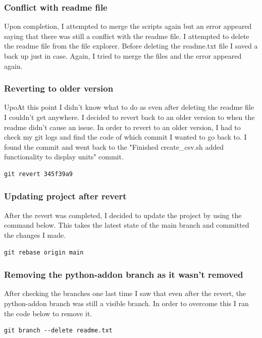 \documentclass[]{article}
\begin{document}
\subsubsection{Conflict with readme file}
Upon completion, I attempted to merge the scripts again but an error appeared saying that there was still a conflict with the readme file.
I attempted to delete the readme file from the file explorer. Before deleting the readme.txt file I saved a back up just in case. Again, I tried
to merge the files and the error appeared again.


\subsubsection{Reverting to older version}
UpoAt this point I didn't know what to do as even after deleting the readme file I couldn't get anywhere.
I decided to revert back to an older version to when the readme didn't cause an issue. In order to revert to
an older version, I had to check my git logs and find the code of which commit I wanted to go back to. I found
the commit and went back to the "Finished create\_csv.sh added functionality to display units" commit.
\begin{tcolorbox}[colback=white, colframe=black, boxrule=1pt, 
    fonttitle=\bfseries, listing only, listing options={language=sh, basicstyle=\ttfamily}]
\begin{verbatim}
git revert 345f39a9
\end{verbatim}
\end{tcolorbox}

\subsubsection{Updating project after revert}
After the revert was completed, I decided to update the project by using the command below. This takes the latest state
of the main branch and committed the changes I made.
\begin{tcolorbox}[colback=white, colframe=black, boxrule=1pt, 
    fonttitle=\bfseries, listing only, listing options={language=sh, basicstyle=\ttfamily}]
\begin{verbatim}
git rebase origin main
\end{verbatim}
\end{tcolorbox}

\subsubsection{Removing the python-addon branch as it wasn't removed}
After checking the branches one last time I saw that even after the revert, the
python-addon branch was still a visible branch. In order to overcome this I ran the code below to remove it.
\begin{tcolorbox}[colback=white, colframe=black, boxrule=1pt, 
    fonttitle=\bfseries, listing only, listing options={language=sh, basicstyle=\ttfamily}]
\begin{verbatim}
git branch --delete readme.txt
\end{verbatim}
\end{tcolorbox}
\end{document}
